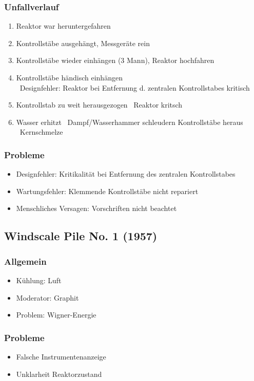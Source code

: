 \documentclass[12pt]{article}
\begin{document}
\subsubsection{Unfallverlauf}
\begin{enumerate}
	\item Reaktor war heruntergefahren
	\item Kontrollstäbe ausgehängt, Messgeräte rein
	\item Kontrollstäbe wieder einhängen (3 Mann), Reaktor hochfahren
	\item Kontrollstäbe händisch einhängen\\
		\textrightarrow\ Designfehler: Reaktor bei Entfernung d. zentralen Kontrollstabes kritisch
	\item Kontrollstab zu weit herausgezogen \textrightarrow\ Reaktor kritsch
	\item Wasser erhitzt \textrightarrow\ Dampf/Wasserhammer schleudern Kontrollstäbe heraus \textrightarrow\ Kernschmelze
\end{enumerate}

\subsubsection{Probleme}
\begin{itemize}[noitemsep]
	\item Designfehler: Kritikalität bei Entfernung des zentralen Kontrollstabes
	\item Wartungsfehler: Klemmende Kontrollstäbe nicht repariert
	\item Menschliches Versagen: Vorschriften nicht beachtet
\end{itemize}

\subsection{Windscale Pile No. 1 (1957)}

\subsubsection{Allgemein}
\begin{itemize}[noitemsep]
	\item Kühlung: Luft
	\item Moderator: Graphit
	\item Problem: Wigner-Energie
\end{itemize}

\subsubsection{Probleme}
\begin{itemize}[noitemsep]
	\item Falsche Instrumentenanzeige
	\item Unklarheit Reaktorzustand
\end{itemize}
\end{document}
